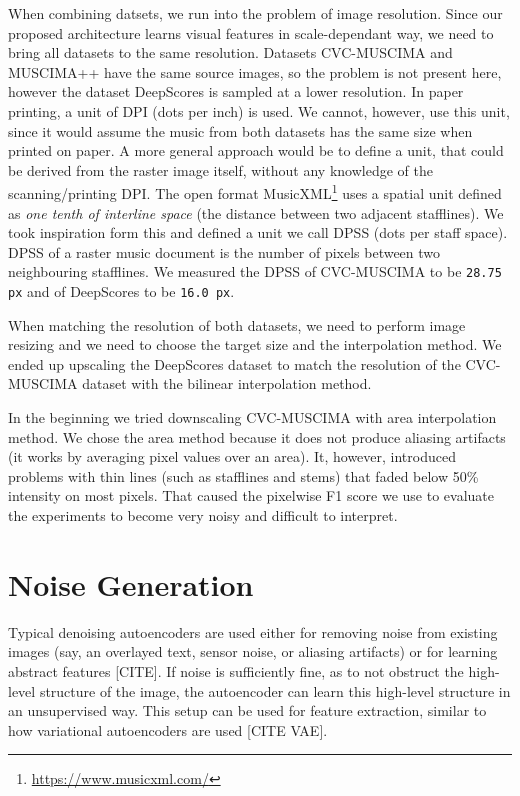 When combining datsets, we run into the problem of image resolution. Since our proposed architecture learns visual features in scale-dependant way, we need to bring all datasets to the same resolution. Datasets CVC-MUSCIMA and MUSCIMA++ have the same source images, so the problem is not present here, however the dataset DeepScores is sampled at a lower resolution. In paper printing, a unit of DPI (dots per inch) is used. We cannot, however, use this unit, since it would assume the music from both datasets has the same size when printed on paper. A more general approach would be to define a unit, that could be derived from the raster image itself, without any knowledge of the scanning/printing DPI. The open format MusicXML\footnote{\url{https://www.musicxml.com/}} uses a spatial unit defined as \emph{one tenth of interline space} (the distance between two adjacent stafflines). We took inspiration form this and defined a unit we call DPSS (dots per staff space). DPSS of a raster music document is the number of pixels between two neighbouring stafflines. We measured the DPSS of CVC-MUSCIMA to be \verb`28.75 px` and of DeepScores to be \verb`16.0 px`.


When matching the resolution of both datasets, we need to perform image resizing and we need to choose the target size and the interpolation method. We ended up upscaling the DeepScores dataset to match the resolution of the CVC-MUSCIMA dataset with the bilinear interpolation method.

In the beginning we tried downscaling CVC-MUSCIMA with area interpolation method. We chose the area method because it does not produce aliasing artifacts (it works by averaging pixel values over an area). It, however, introduced problems with thin lines (such as stafflines and stems) that faded below 50\% intensity on most pixels. That caused the pixelwise F1 score we use to evaluate the experiments to become very noisy and difficult to interpret.


\section{Noise Generation}
\label{sec:NoiseGeneration}

Typical denoising autoencoders are used either for removing noise from existing images (say, an overlayed text, sensor noise, or aliasing artifacts) or for learning abstract features [CITE]. If noise is sufficiently fine, as to not obstruct the high-level structure of the image, the autoencoder can learn this high-level structure in an unsupervised way. This setup can be used for feature extraction, similar to how variational autoencoders are used [CITE VAE].

